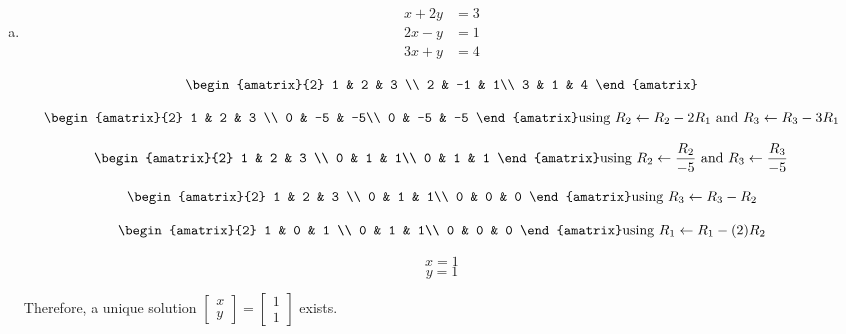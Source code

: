 \documentclass[11pt]{article}
\begin{document}
\begin{enumerate}[(a)]
    \item 
    \begin{align*}
        x + 2y &= 3 \\
        2x - y &= 1 \\
        3x + y &= 4
    \end{align*}
    
    \begin{Answer}
		$$\begin{amatrix}{2}
   		1 & 2 & 3 \\  
		2 & -1 & 1\\
		3 & 1 & 4
		\end{amatrix}$$
		
		$$\begin{amatrix}{2}
   		1 & 2 & 3 \\  
		0 & -5 & -5\\
		0 & -5 & -5
		\end{amatrix} \text{using } R_2 \leftarrow R_2 - 2R_1 \text{ and }  R_3 \leftarrow R_3 - 3R_1$$
		
		$$\begin{amatrix}{2}
   		1 & 2 & 3 \\  
		0 & 1 & 1\\
		0 & 1 & 1
		\end{amatrix} \text{using } R_2 \leftarrow \frac{R_2}{-5} \text{ and }  R_3 \leftarrow \frac{R_3}{-5}$$
		
		$$\begin{amatrix}{2}
   		1 & 2 & 3 \\  
		0 & 1 & 1\\
		0 & 0 & 0
		\end{amatrix}\text{using } R_3 \leftarrow R_3 - R_2$$
		
		$$\begin{amatrix}{2}
   		1 & 0 & 1 \\  
		0 & 1 & 1\\
		0 & 0 & 0
		\end{amatrix}\text{using } R_1 \leftarrow R_1 - (2)R_2$$
		
		$$x = 1$$
		$$y = 1$$
		
		Therefore, a unique solution $\begin{bmatrix} x \\ y \end{bmatrix} = \begin{bmatrix} 1 \\ 1 \end{bmatrix}$ exists.
		

\end{Answer}
\end{enumerate}
\end{document}
